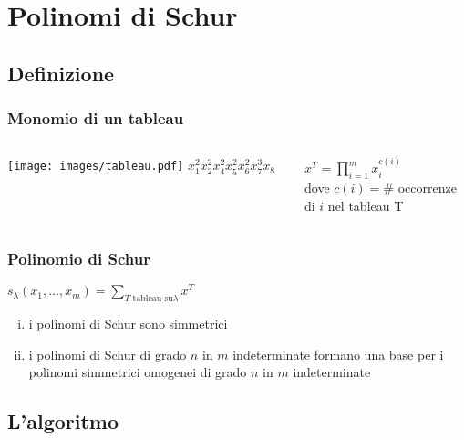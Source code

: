 \documentclass{beamer}
\begin{document}

\section{Polinomi di Schur}

\subsection{Definizione}

\begin{frame}
\frametitle{Monomio di un tableau}
\centering
\begin{columns}
\begin{column}{5cm}
\texttt{[image: images/tableau.pdf]}
\Large $x_1^2 x_2^2 x_4^2 x_5^2 x_6^2 x_7^3 x_8$
\end{column}
\begin{column}{5cm}
$x^T = \prod\limits_{i = 1}^m x_i^{c(i)}$\\
dove $c(i)=\#$ occorrenze \\\hspace{1cm} di $i$ nel tableau T
\end{column}
\end{columns}
\end{frame}

\begin{frame}
\frametitle{Polinomio di Schur}
$s_\lambda(x_1,\ldots,x_m) = \sum\limits_{T \text{ tableau su}\lambda}
x^T$
\vspace{1.5cm}
\begin{enumerate}[(i)]
\item i polinomi di Schur sono simmetrici
\item i polinomi di Schur di grado $n$ in $m$ indeterminate formano una
  base per i polinomi simmetrici omogenei di grado $n$ in $m$ indeterminate
\end{enumerate}
\end{frame}

\subsection{L'algoritmo}
\end{document}
